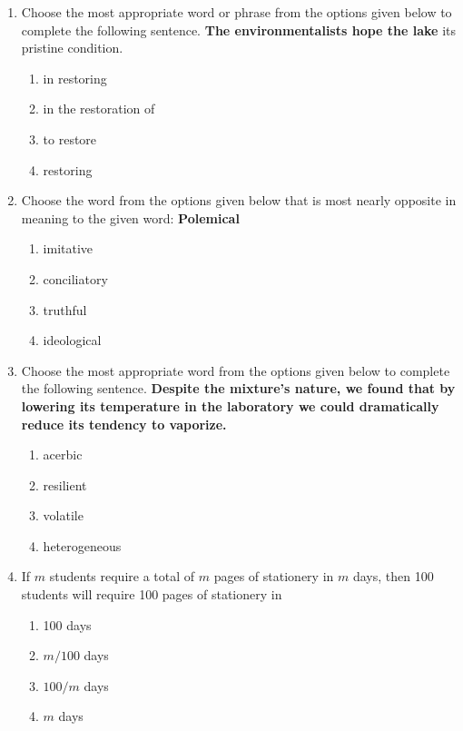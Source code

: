 \documentclass[journal,12pt,onecolumn]{IEEEtran}
\theoremstyle{remark}
\begin{document}
\setcounter{enumi}{55}
\begin{enumerate}[resume]
\item Choose the most appropriate word or phrase from the options given below to complete the following sentence.  
\textbf{The environmentalists hope the lake }\underline{\hspace{2cm}} its pristine condition.  
\begin{enumerate}
\item in restoring  
\item in the restoration of  
\item to restore  
\item restoring  
\end{enumerate}

\item Choose the word from the options given below that is most nearly opposite in meaning to the given word: \textbf{Polemical}  
\begin{enumerate}
\item imitative  
\item conciliatory  
\item truthful  
\item ideological  
\end{enumerate}

\item Choose the most appropriate word from the options given below to complete the following sentence.  
\textbf{Despite the mixture's \underline{\hspace{1cm}} nature, we found that by lowering its temperature in the laboratory we could dramatically reduce its tendency to vaporize.  }
\begin{enumerate}
\item acerbic  
\item resilient  
\item volatile  
\item heterogeneous  
\end{enumerate}

\item If \(m\) students require a total of \(m\) pages of stationery in \(m\) days, then 100 students will require 100 pages of stationery in  
\begin{multicols}{4}
\begin{enumerate}
\item 100 days  
\item \(m/100\) days  
\item \(100/m\) days  
\item \(m\) days  
\end{enumerate}
\end{multicols}


\end{enumerate}
\end{document}
